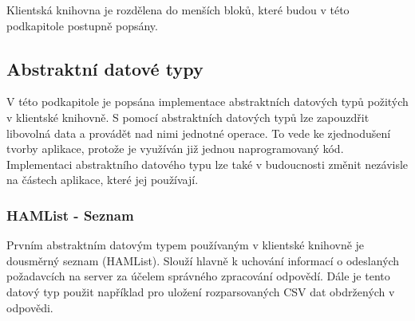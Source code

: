 Klientská knihovna je rozdělena do menších bloků, které budou v této podkapitole
postupně popsány.

\subsection{Abstraktní datové typy}

V této podkapitole je popsána implementace abstraktních datových typů požitých v klientské knihovně.
S pomocí abstraktních datových typů lze zapouzdřit libovolná data a provádět nad nimi jednotné operace.
To vede ke zjednodušení tvorby aplikace, protože je využíván již jednou naprogramovaný kód. Implementaci
abstraktního datového typu lze také v budoucnosti změnit nezávisle na částech aplikace, které jej používají.
\subsubsection{HAMList - Seznam}

Prvním abstraktním datovým typem používaným v klientské knihovně
je dousměrný seznam (HAMList). Slouží hlavně k uchování informací o odeslaných požadavcích na server za účelem
správného zpracování odpovědí. Dále je tento datový typ použit například pro uložení rozparsovaných CSV dat obdržených
v odpovědi.

